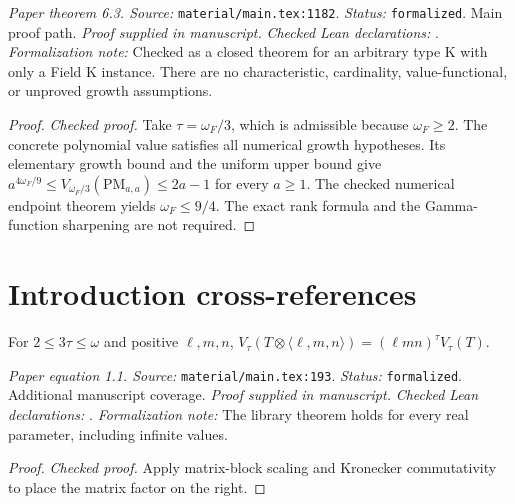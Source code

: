\noindent\textit{Paper theorem 6.3. Source:} \texttt{material/main.tex:1182}.
\textit{Status:} \texttt{formalized}. Main proof path.
\textit{Proof supplied in manuscript.}
\textit{Checked Lean declarations:} .
\textit{Formalization note:} Checked as a closed theorem for an arbitrary type K with only a Field K instance. There are no characteristic, cardinality, value-functional, or unproved growth assumptions.

\begin{proof}
\leanok
{}
\textit{Checked proof.} Take $\tau=\omega_F/3$, which is admissible because $\omega_F\ge2$. The concrete polynomial value satisfies all numerical growth hypotheses. Its elementary growth bound and the uniform upper bound give $a^{4\omega_F/9}\le V_{\omega_F/3}(\mathrm{PM}_{a,a})\le2a-1$ for every $a\ge1$. The checked numerical endpoint theorem yields $\omega_F\le9/4$. The exact rank formula and the Gamma-function sharpening are not required.
\end{proof}

\section{Introduction cross-references}

\renewcommand{\thetheorem}{1.1}
\begin{equationresult}
\label{eq:matmul-normalization}
\manuscriptproof
{}
\leanok
For $2\le3\tau\le\omega$ and positive $\ell,m,n$, $V_\tau(T\otimes\langle\ell,m,n\rangle)=(\ell mn)^\tau V_\tau(T)$.
\end{equationresult}

\noindent\textit{Paper equation 1.1. Source:} \texttt{material/main.tex:193}.
\textit{Status:} \texttt{formalized}. Additional manuscript coverage.
\textit{Proof supplied in manuscript.}
\textit{Checked Lean declarations:} .
\textit{Formalization note:} The library theorem holds for every real parameter, including infinite values.

\begin{proof}
\leanok
{}
\textit{Checked proof.} Apply matrix-block scaling and Kronecker commutativity to place the matrix factor on the right.
\end{proof}

